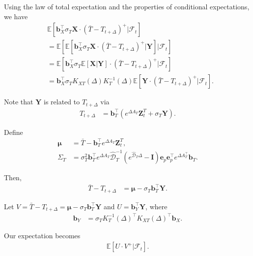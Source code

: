 \documentclass[10pt,a4paper,reqno]{amsart}
\theoremstyle{example}
\begin{document}
Using the law of total expectation and the properties of conditional expectations, we have
\begin{align}
&\mathbb{E}\left[ \mathbf{b}_X^\intercal \sigma_T \mathbf{X} \cdot (\bar{T} - T_{t+\Delta})^+ \Bigg| \mathcal{F}_t \right] \nonumber \\
&= \mathbb{E}\left[ \mathbb{E}\left[ \mathbf{b}_X^\intercal \sigma_T \mathbf{X} \cdot (\bar{T} - T_{t+\Delta})^+ \Bigg| \mathbf{Y} \right] \Bigg| \mathcal{F}_t \right] \nonumber \\
&= \mathbb{E}\left[ \mathbf{b}_X^\intercal \sigma_T \mathbb{E}\left[ \mathbf{X} \Big| \mathbf{Y} \right] \cdot (\bar{T} - T_{t+\Delta})^+ \Bigg| \mathcal{F}_t \right] \nonumber \\
&= \mathbf{b}_X^\intercal \sigma_T K_{XT}(\Delta) K_T^{-1}(\Delta) \mathbb{E}\left[ \mathbf{Y} \cdot (\bar{T} - T_{t+\Delta})^+ \Bigg| \mathcal{F}_t \right].
\end{align}

Note that $\mathbf{Y}$ is related to $T_{t+\Delta}$ via
\begin{align}
T_{t+\Delta} &= \mathbf{b}_T^\intercal \left( e^{\Delta A_T} \mathbf{Z}_t^T + \sigma_T \mathbf{Y} \right).
\end{align}

Define
\begin{align}
\boldsymbol{\mu} &= \bar{T} - \mathbf{b}_T^\intercal e^{\Delta A_T} \mathbf{Z}_t^T, \\
\Sigma_T &= \sigma_T^2 \mathbf{b}_T^\intercal e^{\Delta A_T} \hat{\mathcal{D}}_T^{-1} \left( e^{\hat{\mathcal{D}}_T \Delta} - \mathbf{I} \right) \mathbf{e}_p \mathbf{e}_p^\intercal e^{\Delta A_T^\intercal} \mathbf{b}_T.
\end{align}

Then,
\begin{align}
\bar{T} - T_{t+\Delta} &= \boldsymbol{\mu} - \sigma_T \mathbf{b}_T^\intercal \mathbf{Y}.
\end{align}

Let $V = \bar{T} - T_{t+\Delta} = \boldsymbol{\mu} - \sigma_T \mathbf{b}_T^\intercal \mathbf{Y}$ and $U = \mathbf{b}_Y^\intercal \mathbf{Y}$, where
\begin{align}
\mathbf{b}_Y &= \sigma_T K_T^{-1}(\Delta)^\intercal K_{XT}(\Delta)^\intercal \mathbf{b}_X.
\end{align}

Our expectation becomes
\begin{align}
\mathbb{E}\left[ U \cdot V^+ \Big| \mathcal{F}_t \right].
\end{align}
\end{document}

